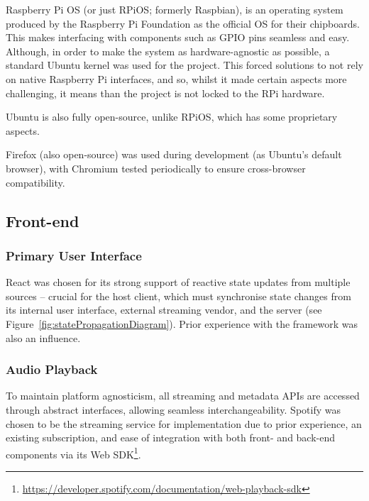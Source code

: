                 Raspberry Pi OS (or just RPiOS; formerly Raspbian), is an operating system produced by the Raspberry Pi Foundation as the official OS for their chipboards. This makes interfacing with components such as GPIO pins seamless and easy. Although, in order to make the system as hardware-agnostic as possible, a standard Ubuntu kernel was used for the project. This forced solutions to not rely on native Raspberry Pi interfaces, and so, whilst it made certain aspects more challenging, it means than the project is not locked to the RPi hardware.
    
                Ubuntu is also fully open-source, unlike RPiOS, which has some proprietary aspects.
    
                Firefox (also open-source) was used during development (as Ubuntu's default browser), with Chromium tested periodically to ensure cross-browser compatibility.
                
        
        \subsection{Front-end}
            \subsubsection{Primary User Interface}
    
                React was chosen for its strong support of reactive state updates from multiple sources -- crucial for the host client, which must synchronise state changes from its internal user interface, external streaming vendor, and the server (see Figure~\ref{fig:statePropagationDiagram}). Prior experience with the framework was also an influence.
            
            \subsubsection{Audio Playback}
    
                To maintain platform agnosticism, all streaming and metadata APIs are accessed through abstract interfaces, allowing seamless interchangeability. Spotify was chosen to be the streaming service for implementation due to prior experience, an existing subscription, and ease of integration with both front- and back-end components via its Web SDK\footnote{\url{https://developer.spotify.com/documentation/web-playback-sdk}}.
    
